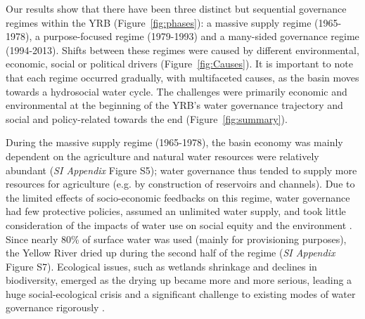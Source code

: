 \documentclass[9pt, twocolumn, twoside, lineno]{pnas-new}
\begin{document}
Our results show that there have been three distinct but sequential governance regimes within the YRB (Figure~\ref{fig:phases}): a massive supply regime (1965-1978), a purpose-focused regime (1979-1993) and a many-sided governance regime (1994-2013). Shifts between these regimes were caused by different environmental, economic, social or political drivers (Figure~\ref{fig:Causes}).
It is important to note that each regime occurred gradually, with multifaceted causes, as the basin moves towards a hydrosocial water cycle.
The challenges were primarily economic and environmental at the beginning of the YRB's water governance trajectory and social and policy-related towards the end (Figure~\ref{fig:summary}).

During the massive supply regime (1965-1978), the basin economy was mainly dependent on the agriculture and natural water resources were relatively abundant (\textit{SI Appendix} Figure S5); water governance thus tended to supply more resources for agriculture (e.g. by construction of reservoirs and channels). 
Due to the limited effects of socio-economic feedbacks on this regime, water governance had few protective policies, assumed an unlimited water supply, and took little consideration of the impacts of water use on social equity and the environment 
\cite{zhouDecelerationChinahuman2020}. 
Since nearly 80\% of surface water was used (mainly for provisioning purposes), the Yellow River dried up during the second half of the regime (\textit{SI Appendix} Figure S7). 
Ecological issues, such as wetlands shrinkage and declines in biodiversity, emerged as the drying up became more and more serious, leading a huge social-ecological crisis and a significant challenge to existing modes of water governance rigorously 
\cite{wohlfartSocialecologicalchallenges2016}.
\end{document}
